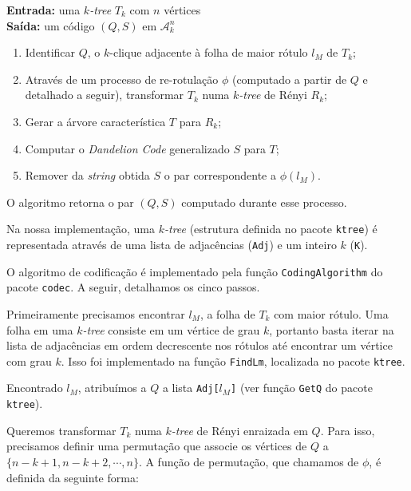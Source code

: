 \begin{algorithm}
  \textbf{Entrada:} uma \emph{$k$-tree} $T_k$ com $n$ vértices\\
  \textbf{Saída:} um código $(Q, S)$ em $\mathcal{A}^n_k$

  \begin{enumerate}
    \item Identificar $Q$, o $k$-clique adjacente à folha de maior rótulo $l_M$ de $T_k$;
    \item Através de um processo de re-rotulação $\phi$ (computado a partir de $Q$ e detalhado a seguir), transformar $T_k$ numa \emph{$k$-tree} de Rényi $R_k$;
    \item Gerar a árvore característica $T$ para $R_k$;
    \item Computar o \emph{Dandelion Code} generalizado $S$ para $T$;
    \item Remover da \emph{string} obtida $S$ o par correspondente a $\phi(l_M)$.
  \end{enumerate}

  O algoritmo retorna o par $(Q, S)$ computado durante esse processo.

  \vspace{2em}

  Na nossa implementação, uma \emph{$k$-tree} (estrutura definida no pacote {\tt ktree}) é representada através de uma lista de adjacências ({\tt Adj}) e um inteiro $k$ ({\tt K}).

  O algoritmo de codificação é implementado pela função {\tt CodingAlgorithm} do pacote {\tt codec}. A seguir, detalhamos os cinco passos.

  \begin{step}
    Primeiramente precisamos encontrar $l_M$, a folha de $T_k$ com maior rótulo. Uma folha em uma \emph{$k$-tree} consiste em um vértice de grau $k$, portanto basta iterar na lista de adjacências em ordem decrescente nos rótulos até encontrar um vértice com grau $k$. Isso foi implementado na função {\tt FindLm}, localizada no pacote {\tt ktree}.

    Encontrado $l_M$, atribuímos a $Q$ a lista {\tt Adj[$l_M$]} (ver função {\tt GetQ} do pacote {\tt ktree}).
  \end{step}

  \begin{step}
    Queremos transformar $T_k$ numa \emph{$k$-tree} de Rényi enraizada em $Q$. Para isso, precisamos definir uma permutação que associe os vértices de $Q$ a $\{n-k+1, n-k+2, \cdots, n\}$. A função de permutação, que chamamos de $\phi$, é definida da seguinte forma:


\end{step}
\end{algorithm}
